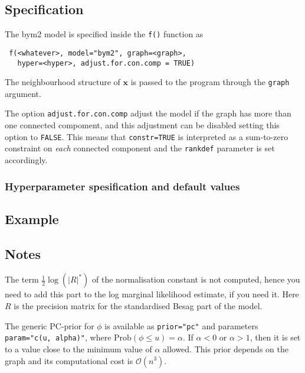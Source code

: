 \documentclass[a4paper,11pt]{article}
\begin{document}
\subsection*{Specification}

The bym2 model is specified inside the {\tt f()} function as
\begin{verbatim}
 f(<whatever>, model="bym2", graph=<graph>,
   hyper=<hyper>, adjust.for.con.comp = TRUE)
\end{verbatim}
The neighbourhood structure of $\mathbf{x}$ is passed to the program
through the {\tt graph} argument.

The option \verb|adjust.for.con.comp| adjust the model if the graph
has more than one connected compoment, and this adjustment can be
disabled setting this option to \texttt{FALSE}. This means that
\texttt{constr=TRUE} is interpreted as a sum-to-zero constraint on
\emph{each} connected component and the \texttt{rankdef} parameter is
set accordingly. 

\subsubsection*{Hyperparameter spesification and default values}



\subsection*{Example}



\subsection*{Notes}

The term $\frac{1}{2}\log(|R|^{*})$ of the normalisation constant is
not computed, hence you need to add this part to the log marginal
likelihood estimate, if you need it. Here $R$ is the precision matrix
for the standardised Besag part of the model.

The generic PC-prior for $\phi$ is available as \texttt{prior="pc"}
and parameters \texttt{param="c(u, alpha)"}, where $\text{Prob}(\phi
\le u) = \alpha$. If $\alpha < 0$ or $\alpha>1$, then it is set to a value
close to the minimum value of $\alpha$ allowed. This prior depends on
the graph and its computational cost is ${\mathcal O}(n^{3})$.
\end{document}
